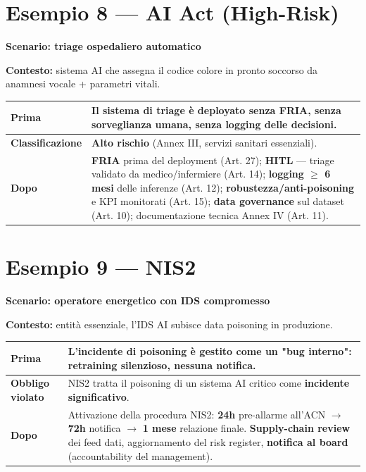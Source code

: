 \documentclass[11pt, a4paper]{article}
\begin{document}
\section*{Esempio 8 — AI Act (High-Risk)}
\textbf{Scenario: triage ospedaliero automatico}

\textbf{Contesto:} sistema AI che assegna il codice colore in pronto soccorso da anamnesi vocale + parametri vitali.

\noindent
\begin{tabularx}{\textwidth}{|>{\bfseries}l|X|}
\hline
Prima & Il sistema di triage è deployato senza FRIA, senza sorveglianza umana, senza logging delle decisioni. \\ \hline
Classificazione & \textbf{Alto rischio} (Annex III, servizi sanitari essenziali). \\ \hline
Dopo & \textbf{FRIA} prima del deployment (Art. 27); \textbf{HITL} — triage validato da medico/infermiere (Art. 14); \textbf{logging $\ge$ 6 mesi} delle inferenze (Art. 12); \textbf{robustezza/anti-poisoning} e KPI monitorati (Art. 15); \textbf{data governance} sul dataset (Art. 10); documentazione tecnica Annex IV (Art. 11). \\ \hline
\end{tabularx}

\section*{Esempio 9 — NIS2}
\textbf{Scenario: operatore energetico con IDS compromesso}

\textbf{Contesto:} entità essenziale, l'IDS AI subisce data poisoning in produzione.

\noindent
\begin{tabularx}{\textwidth}{|>{\bfseries}l|X|}
\hline
Prima & L'incidente di poisoning è gestito come un "bug interno": retraining silenzioso, nessuna notifica. \\ \hline
Obbligo violato & NIS2 tratta il poisoning di un sistema AI critico come \textbf{incidente significativo}. \\ \hline
Dopo & Attivazione della procedura NIS2: \textbf{24h} pre-allarme all'ACN $\rightarrow$ \textbf{72h} notifica $\rightarrow$ \textbf{1 mese} relazione finale. \textbf{Supply-chain review} dei feed dati, aggiornamento del risk register, \textbf{notifica al board} (accountability del management). \\ \hline
\end{tabularx}
\end{document}
